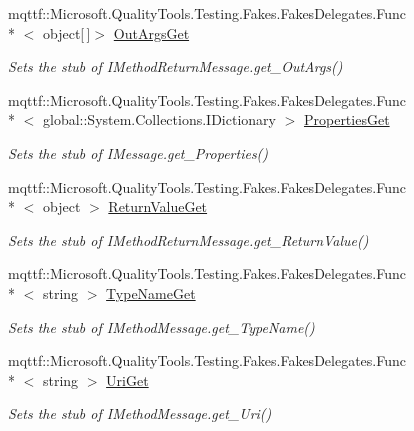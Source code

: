 \begin{DoxyCompactItemize}
mqttf\-::\-Microsoft.\-Quality\-Tools.\-Testing.\-Fakes.\-Fakes\-Delegates.\-Func\\*
$<$ object\mbox{[}$\,$\mbox{]}$>$ \hyperlink{class_system_1_1_runtime_1_1_remoting_1_1_activation_1_1_fakes_1_1_stub_i_construction_return_message_aec1d253d758b7cf3d4bdb35299e74062}{Out\-Args\-Get}
\begin{DoxyCompactList}\small\item\em Sets the stub of I\-Method\-Return\-Message.\-get\-\_\-\-Out\-Args()\end{DoxyCompactList}\item 
mqttf\-::\-Microsoft.\-Quality\-Tools.\-Testing.\-Fakes.\-Fakes\-Delegates.\-Func\\*
$<$ global\-::\-System.\-Collections.\-I\-Dictionary $>$ \hyperlink{class_system_1_1_runtime_1_1_remoting_1_1_activation_1_1_fakes_1_1_stub_i_construction_return_message_ac5dd7ed84428c72897d8fef3b1531b36}{Properties\-Get}
\begin{DoxyCompactList}\small\item\em Sets the stub of I\-Message.\-get\-\_\-\-Properties()\end{DoxyCompactList}\item 
mqttf\-::\-Microsoft.\-Quality\-Tools.\-Testing.\-Fakes.\-Fakes\-Delegates.\-Func\\*
$<$ object $>$ \hyperlink{class_system_1_1_runtime_1_1_remoting_1_1_activation_1_1_fakes_1_1_stub_i_construction_return_message_a96aaca4134e9ee6b634495c2c1ce2ecb}{Return\-Value\-Get}
\begin{DoxyCompactList}\small\item\em Sets the stub of I\-Method\-Return\-Message.\-get\-\_\-\-Return\-Value()\end{DoxyCompactList}\item 
mqttf\-::\-Microsoft.\-Quality\-Tools.\-Testing.\-Fakes.\-Fakes\-Delegates.\-Func\\*
$<$ string $>$ \hyperlink{class_system_1_1_runtime_1_1_remoting_1_1_activation_1_1_fakes_1_1_stub_i_construction_return_message_a6b361a82d827a84cc2dbcc5007cd553e}{Type\-Name\-Get}
\begin{DoxyCompactList}\small\item\em Sets the stub of I\-Method\-Message.\-get\-\_\-\-Type\-Name()\end{DoxyCompactList}\item 
mqttf\-::\-Microsoft.\-Quality\-Tools.\-Testing.\-Fakes.\-Fakes\-Delegates.\-Func\\*
$<$ string $>$ \hyperlink{class_system_1_1_runtime_1_1_remoting_1_1_activation_1_1_fakes_1_1_stub_i_construction_return_message_aebe2c5c8767def9a7b6b8a9c9eaea56c}{Uri\-Get}
\begin{DoxyCompactList}\small\item\em Sets the stub of I\-Method\-Message.\-get\-\_\-\-Uri()\end{DoxyCompactList}\end{DoxyCompactItemize}


